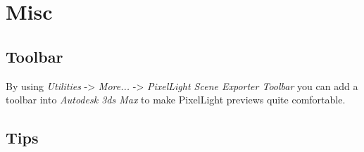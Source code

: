 \chapter{Misc}




\section{Toolbar}
By using \emph{Utilities} -> \emph{More...} -> \emph{PixelLight Scene Exporter Toolbar} you can add a toolbar into \emph{Autodesk 3ds Max} to make PixelLight previews quite comfortable.




\section{Tips}
